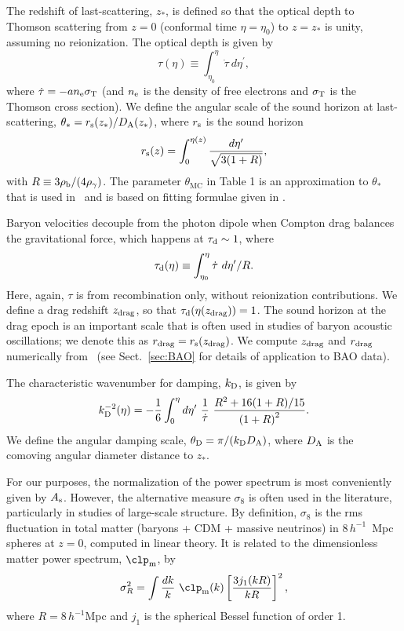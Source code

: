 The redshift of last-scattering, $z_\ast$, is defined so that the optical
depth to Thomson scattering from $z=0$ (conformal time $\eta = \eta_0$)
to $z=z_\ast$ is unity, assuming no reionization.  The optical depth is
given by
\begin{equation}
  \tau(\eta) \equiv \int_{\eta_0}^\eta \dot\tau\ d\eta^\prime,
\end{equation}
where $\dot\tau = - an_{\rm e}\sigma_{\rm T}$ (and $n_{\rm e}$ is the density of free electrons and $\sigma_{\rm T}$ is the Thomson
cross section).  We define the angular scale of the sound horizon at last-scattering,
$\theta_\ast =r_{\rm s}(z_\ast)/D_{\rm A}(z_\ast)$, where $r_{\rm s}$ is
the sound horizon
\begin{equation}
  r_{\rm s}(z) = \int_0^{\eta(z)}  \frac{d\eta^\prime}{\sqrt{3(1+R)}},
\end{equation}
with $R \equiv 3 \rho_{\rm b}/(4\rho_\gamma)$. The parameter $\theta_{\mathrm{MC}}$
in Table 1 is an approximation to $\theta_\ast$ that is used in \COSMOMC\ and
is based on fitting formulae given in \citet{Hu:1995en}.

Baryon velocities decouple from the photon dipole when Compton
drag balances the gravitational force,  which happens at
$\tau_{\rm d} \sim 1$, where \citep{Hu:1995en}
\begin{equation}
  \tau_{\rm d}(\eta) \equiv \int^\eta_{\eta_0} \dot\tau\ d\eta^\prime/R.
\end{equation}
Here, again, $\tau$ is from recombination only, without reionization
contributions.
We define a drag redshift $z_{\rm drag}$, so that
$\tau_{\rm d}(\eta(z_{\rm drag})) = 1$.
The sound horizon at the drag epoch is an important scale that is often
used in studies of baryon acoustic oscillations; we denote this as
$r_{\rm drag}=r_{\rm s}(z_{\rm drag})$.  We compute $z_{\rm drag}$ and
$r_{\rm drag}$ numerically from \CAMB\ (see Sect.~\ref{sec:BAO} for details of application to BAO data).


The characteristic wavenumber for damping, $k_{\rm D}$, is given by
\begin{equation}
k_{\rm D}^{-2}(\eta) = -\frac{1}{6} \int_0^\eta d\eta^\prime
  \ \frac{1}{\dot\tau}\ \frac{R^2 + 16 (1+R)/15}{\left(1+R\right)^2}.
\end{equation}
We define the angular damping scale, $\theta_{\rm D} = \pi/(k_{\rm D} D_{\rm A})$, where $D_{\rm A}$
is the comoving angular diameter distance to $z_\ast$.

For our purposes, the normalization of the power spectrum is most conveniently
given by $A_{\rm s}$.  However, the alternative measure
$\sigma_8$ is often used in the literature, particularly in studies of large-scale
structure.  By definition, $\sigma_8$ is the rms fluctuation in total matter
(baryons + CDM + massive neutrinos) in $8\,h^{-1}$~Mpc spheres at
$z=0$, computed in linear theory.  It is related to the dimensionless matter power spectrum,
$\clp_{\rm m}$, by
\begin{equation}
  \sigma_R^2 = \int \frac{dk}{k}\ \clp_{\rm m}(k)
  \left[ \frac{3j_1(kR)}{kR} \right]^2,
\end{equation}
where $R=8\,h^{-1}$Mpc and $j_1$ is the spherical Bessel function of order 1.


